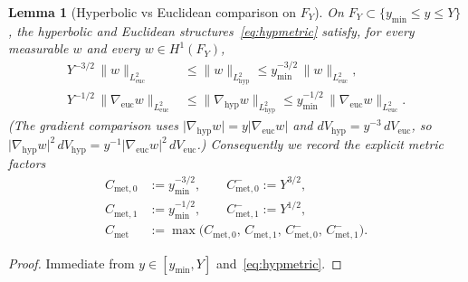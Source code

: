 \documentclass[11pt]{amsart}
\newtheorem{lemma}[theorem]{Lemma}
\theoremstyle{definition}
\newcommand{\abs}[1]{\lvert#1\rvert}
\newcommand{\norm}[1]{\lVert#1\rVert}
\begin{document}
\begin{lemma}[Hyperbolic vs Euclidean comparison on $F_Y$]
\label{lem:metric}
On $F_Y\subset\{y_{\min}\le y\le Y\}$, the hyperbolic and Euclidean
structures~\eqref{eq:hypmetric} satisfy, for every measurable $w$ and
every $w\in H^1(F_Y)$,
\begin{align}
  Y^{-3/2}\,\norm{w}_{L^2_{\mathrm{euc}}}
  &\le
  \norm{w}_{L^2_{\mathrm{hyp}}}
  \le
  y_{\min}^{-3/2}\,\norm{w}_{L^2_{\mathrm{euc}}},
  \label{eq:M-L2}\\
  Y^{-1/2}\,\norm{\nabla_{\mathrm{euc}}w}_{L^2_{\mathrm{euc}}}
  &\le
  \norm{\nabla_{\mathrm{hyp}}w}_{L^2_{\mathrm{hyp}}}
  \le
  y_{\min}^{-1/2}\,\norm{\nabla_{\mathrm{euc}}w}_{L^2_{\mathrm{euc}}}.
  \label{eq:M-grad}
\end{align}
(The gradient comparison uses
$\abs{\nabla_{\mathrm{hyp}}w}=y\abs{\nabla_{\mathrm{euc}}w}$ and
$dV_{\mathrm{hyp}}=y^{-3}\,dV_{\mathrm{euc}}$, so
$\abs{\nabla_{\mathrm{hyp}}w}^2\,dV_{\mathrm{hyp}}
=y^{-1}\abs{\nabla_{\mathrm{euc}}w}^2\,dV_{\mathrm{euc}}$.)
Consequently we record the explicit metric factors
\begin{equation}
\label{eq:Cmet}
\begin{aligned}
  C_{\mathrm{met},0}
  &:=
  y_{\min}^{-3/2},
  \qquad
  C_{\mathrm{met},0}^{-}
  :=
  Y^{3/2},\\
  C_{\mathrm{met},1}
  &:=
  y_{\min}^{-1/2},
  \qquad
  C_{\mathrm{met},1}^{-}
  :=
  Y^{1/2},\\
  C_{\mathrm{met}}
  &:=
  \max\bigl(C_{\mathrm{met},0},\,C_{\mathrm{met},1},\,
  C_{\mathrm{met},0}^{-},\,C_{\mathrm{met},1}^{-}\bigr).
\end{aligned}
\end{equation}
\end{lemma}

\begin{proof}
Immediate from $y\in[y_{\min},Y]$ and~\eqref{eq:hypmetric}.
\end{proof}
\end{document}
